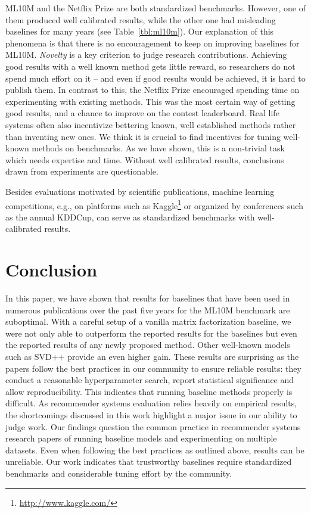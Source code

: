 \documentclass{article}
\begin{document}
ML10M and the Netflix Prize are both standardized benchmarks.
However, one of them produced well calibrated results, while the other one had misleading baselines for many years (see Table~\ref{tbl:ml10m}).
Our explanation of this phenomena is that there is no encouragement to keep on improving baselines for ML10M.
\emph{Novelty} is a key criterion to judge research contributions.
Achieving good results with a well known method gets little reward, so researchers do not spend much effort on it -- and even if good results would be achieved, it is hard to publish them.
In contrast to this, the Netflix Prize encouraged spending time on experimenting with existing methods.
This was the most certain way of getting good results, and a chance to improve on the contest leaderboard.
Real life systems often also incentivize bettering known, well established methods rather than inventing new ones.
We think it is crucial to find incentives for tuning well-known methods on benchmarks.
As we have shown, this is a non-trivial task which needs expertise and time.
Without well calibrated results, conclusions drawn from experiments are questionable.

Besides evaluations motivated by scientific publications, machine learning competitions, e.g., on platforms such as Kaggle\footnote{\url{http://www.kaggle.com/}} or organized by conferences such as the annual KDDCup, can serve as standardized benchmarks with well-calibrated results.




\section{Conclusion}

In this paper, we have shown that results for baselines that have been used in numerous publications over the past five years for the ML10M benchmark are suboptimal.
With a careful setup of a vanilla matrix factorization baseline, we were not only able to outperform the reported results for the baselines but even the reported results of any newly proposed method.
Other well-known models such as SVD++ provide an even higher gain.
These results are surprising as the papers follow the best practices in our community to ensure reliable results:
they conduct a reasonable hyperparameter search, report statistical significance and allow reproducibility.
This indicates that running baseline methods properly is difficult.
As recommender systems evaluation relies heavily on empirical results, the shortcomings discussed in this work highlight a major issue in our ability to judge work.
Our findings question the common practice in recommender systems research papers of running baseline models and experimenting on multiple datasets.
Even when following the best practices as outlined above, results can be unreliable.
Our work indicates that trustworthy baselines require standardized benchmarks and considerable tuning effort by the community.
\end{document}
